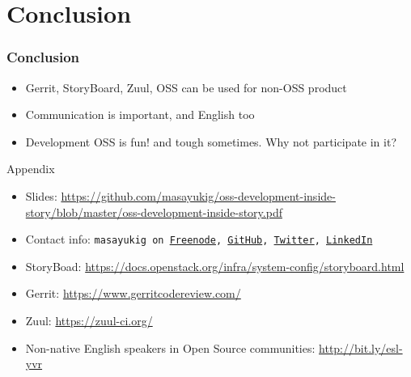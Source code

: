 \documentclass[aspectratio=169,11pt,hyperref={colorlinks=true}]{beamer}
\begin{document}
\section{Conclusion}
\begin{frame}
  \frametitle{Conclusion}
  \begin{itemize}
    \item Gerrit, StoryBoard, Zuul, OSS can be used for non-OSS product
    \item Communication is important, and English too
    \item Development OSS is fun! and tough sometimes. Why not participate in it?
  \end{itemize}
  Appendix
  \begin{itemize}
      \item Slides: \url{https://github.com/masayukig/oss-development-inside-story/blob/master/oss-development-inside-story.pdf}
      \item Contact info: \texttt{masayukig on
        \href{https://freenode.net/}{Freenode},
        \href{https://github.com/masayukig}{GitHub},
        \href{https://twitter.com/masayukig}{Twitter},
        \href{https://www.linkedin.com/in/masayukig/}{LinkedIn}}
      \item StoryBoad: \url{https://docs.openstack.org/infra/system-config/storyboard.html}
      \item Gerrit: \url{https://www.gerritcodereview.com/}
      \item Zuul: \url{https://zuul-ci.org/}
      \item Non-native English speakers in Open Source communities: \url{http://bit.ly/esl-yvr}
  \end{itemize}
\end{frame}
\end{document}
